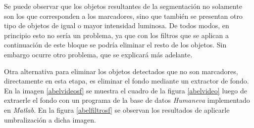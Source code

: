Se puede observar que los objetos resultantes de la segmentación no solamente son los que corresponden a los marcadores, sino que también se presentan otro tipo de objetos de igual o mayor intensidad luminosa. De todos modos, en principio esto no sería un problema, ya que con los filtros que se aplican a continuación de este bloque se podría eliminar el resto de los objetos. Sin embargo ocurre otro problema, que se explicará más adelante.

Otra alternativa para eliminar los objetos detectados que no son marcadores, directamente en esta etapa, es eliminar el fondo mediante un extractor de fondo. En la imagen \ref{abelvideosf} se muestra el cuadro de la figura \ref{abelvideo} luego de extraerle el fondo con un programa de la base de datos \emph{Humaneva} \cite{humanevaBase} implementado en \emph{Matlab}. En la figura \ref{abelfiltrosf} se observan los resultados de aplicarle umbralización a dicha imagen.

